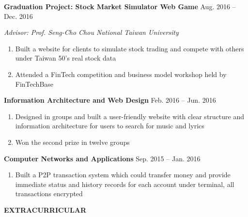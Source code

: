 \documentclass[12pt]{article}
\begin{document}
	\vspace{0.5em}

	\textbf{Graduation Project: Stock Market Simulator Web Game} \hfill Aug. 2016 -- Dec. 2016

	\textit{Advisor: Prof. Seng-Cho Chou \hfill National Taiwan University}

	\begin{enumerate}

		\item Built a website for clients to simulate stock trading and compete with others under Taiwan 50's real stock data

		\item Attended a FinTech competition and business model workshop held by FinTechBase

	\end{enumerate}

	\vspace{0.5em}

	\textbf{Information Architecture and Web Design} \hfill Feb. 2016 -- Jun. 2016

	\begin{enumerate}

		\item Designed in groups and built a user-friendly website with clear structure and information architecture for users to search for music and lyrics

		\item Won the second prize in twelve groups

	\end{enumerate}

	\vspace{0.5em}

	\textbf{Computer Networks and Applications} \hfill Sep. 2015 -- Jan. 2016

	\begin{enumerate}

		\item Built a P2P transaction system which could transfer money and provide immediate status and history records for each account under terminal, all transactions encrypted

	\end{enumerate}

	\vspace{1em}

\textbf{\large{\uppercase{Extracurricular}}}
\hrulefill{}

	\vspace{0.5em}
\end{document}
